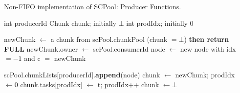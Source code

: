 \begin{algo}[!ht]
\caption{Non-FIFO implementation of SCPool: Producer Functions.}
\label{alg:producer-non-fifo}
\scriptsize
\begin{minipage}[t]{0.48\textwidth}
\begin{distribalgo}[1]
\setcounter{ALC@line}{\value{alg:non-fifo:lines}}

	\STATE int producerId
	\STATE Chunk chunk; initially $\bot$ 
	\STATE int prodIdx; initially $0$ 
\ENDINDENT

\setcounter{alg:non-fifo:lines}{\value{ALC@line}} %
\end{distribalgo}
\end{minipage}%
%
\hfill
%
\begin{minipage}[t]{0.48\textwidth}
%
\begin{distribalgo}[1]
\setcounter{ALC@line}{\value{alg:non-fifo:lines}}

		\STATE newChunk $\leftarrow$ a chunk from scPool.chunkPool
		 (chunk $= \bot$) {\bf then return FULL} 
		\STATE newChunk.owner $\leftarrow$ scPool.consumerId
		\STATE node $\leftarrow$ new node with idx $=-1$ and c $=$ newChunk
		
		\STATE scPool.chunkLists[producerId].{\bf append}(node)
		\STATE chunk $\leftarrow$ newChunk; prodIdx $\leftarrow 0$ 
	\ENDINDENT
	\STATE chunk.tasks[prodIdx] $\leftarrow$ t; prodIdx++
	  \STATE chunk $\leftarrow \bot$ 
	\ENDINDENT
\ENDINDENT

\setcounter{alg:non-fifo:lines}{\value{ALC@line}}
\end{distribalgo}
\end{minipage}
\end{algo}

